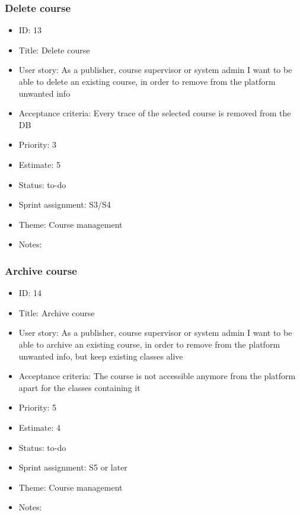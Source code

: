 \subsubsection{Delete course}
\begin{itemize}
	\item ID: 13 
	\item Title: Delete course
	\item User story: As a publisher, course supervisor or system admin I want to be able to delete an existing course, in order to remove from the platform unwanted info
	\item Acceptance criteria: Every trace of the selected course is removed from the DB
	\item Priority: 3
	\item Estimate: 5
	\item Status: to-do
	\item Sprint assignment: S3/S4
	\item Theme: Course management
	\item Notes:
\end{itemize}

\subsubsection{Archive course}
\begin{itemize}
	\item ID: 14 
	\item Title: Archive course
	\item User story: As a publisher, course supervisor or system admin I want to be able to archive an existing course, in order to remove from the platform unwanted info, but keep existing classes alive
	\item Acceptance criteria: The course is not accessible anymore from the platform apart for the classes containing it
	\item Priority: 5
	\item Estimate: 4
	\item Status: to-do
	\item Sprint assignment: S5 or later
	\item Theme: Course management
	\item Notes:
\end{itemize}

